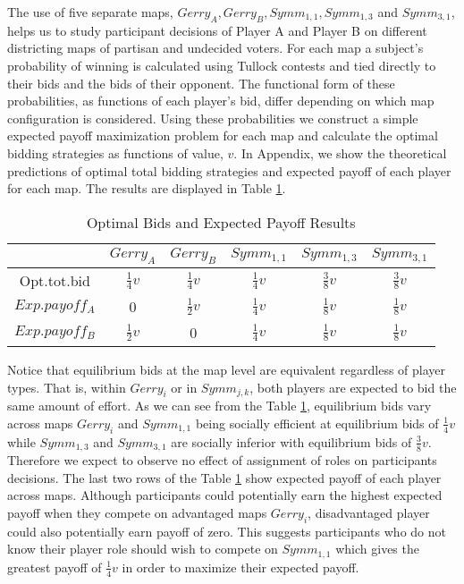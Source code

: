 \documentclass[AER]{AEA}
\begin{document}
The use of five separate maps, $Gerry_A, Gerry_B, Symm_{1,1}, Symm_{1,3}$ and $Symm_{3,1}$, helps us to study participant decisions of Player A and Player B on different districting maps of partisan and undecided voters. For each map a subject's probability of winning is calculated using Tullock contests and tied directly to their bids and the bids of their opponent. The functional form of these probabilities, as functions of each player's bid, differ depending on which map configuration is considered. Using these probabilities we construct a simple expected payoff maximization problem for each map and calculate the optimal bidding strategies as functions of value, $v$. In Appendix, we show the theoretical predictions of optimal total bidding strategies and expected payoff of each player for each map. The results are displayed in Table \ref{table:opt}.
\begin{table}[ht]
\caption{Optimal Bids and Expected Payoff Results} %
\centering %
\begin{tabular}{c c c c c c} %
\hline\hline %
 & $Gerry_A$ & $Gerry_B$ & $Symm_{1,1}$ & $Symm_{1,3}$ & $Symm_{3,1}$ \\ [0.5ex] %
\hline %
Opt.tot.bid & $\frac{1}{4}v$ & $\frac{1}{4}v$ & $\frac{1}{4}v$ & $\frac{3}{8}v$ & $\frac{3}{8}v$ \\ %
$Exp.payoff_A$ & 0 & $\frac{1}{2}v$ & $\frac{1}{4}v$ & $\frac{1}{8}v$ & $\frac{1}{8}v$ \\
$Exp.payoff_B$ & $\frac{1}{2}v$ & 0 & $\frac{1}{4}v$ & $\frac{1}{8}v$ & $\frac{1}{8}v$ \\ [1ex] %
\hline %
\end{tabular}
\label{table:opt} %
\end{table}
Notice that equilibrium bids at the map level are equivalent regardless of player types. That is, within $Gerry_i$ or in $Symm_{j,k}$, both players are expected to bid the same amount of effort. As we can see from the Table \ref{table:opt}, equilibrium bids vary across maps $Gerry_i$ and $Symm_{1,1}$ being socially efficient at equilibrium bids of $\frac{1}{4}v$ while $Symm_{1,3}$ and $Symm_{3,1}$ are socially inferior with equilibrium bids of $\frac{3}{8}v$. Therefore we expect to observe no effect of assignment of roles on participants decisions. The last two rows of the Table \ref{table:opt} show expected payoff of each player across maps. Although participants could potentially earn the highest expected payoff when they compete on advantaged maps $Gerry_i$, disadvantaged player could also potentially earn payoff of zero. This suggests participants who do not know their player role should wish to compete on $Symm_{1,1}$ which gives the greatest payoff of $\frac{1}{4}v$ in order to maximize their expected payoff.
\end{document}
